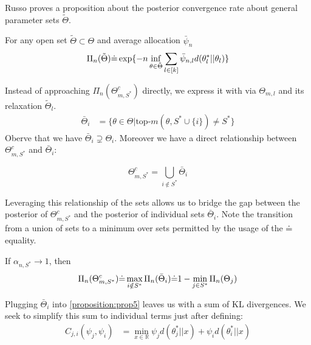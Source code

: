 Russo proves a proposition about the posterior convergence rate about general parameter sets $\tilde{\Theta}$.

\begin{proposition}\label{proposition:prop5}
  For any open set $\tilde{\Theta} \subset \Theta$ and average allocation $\bar{\psi}_n$
  \[\Pi_n(\tilde{\Theta}) \dot{=} \exp\{-n \inf_{\theta \in \tilde{\Theta}} \sum_{l \in [k]} \bar{\psi}_{n, l} d(\theta^*_l || \theta_l)\}\]
\end{proposition}

Instead of approaching $\Pi_n(\Theta_{m, S^*}^c)$ directly, we express it with via $\Theta_{m, l}$ and its relaxation $\tilde{\Theta}_l$.
\begin{align}
    \bar{\Theta}_i &= \{ \theta \in \Theta | \text{top-}m(\theta, S^* \cup \{i\}) \neq S^*\}
\end{align}
Oberve that we have $\bar{\Theta}_i \supsetneq \Theta_i$. Moreover we have a direct relationship between $\Theta_{m, S^*}^c$ and $\bar{\Theta}_i$:

\begin{lemma}\label{lemma:set_relation_S*_i}
  \[\Theta_{m, S^*}^c = \bigcup_{i \notin S^*} \bar{\Theta}_i \label{eq: eq_union}\]
\end{lemma}

Leveraging this relationship of the sets allows us to bridge the gap between the posterior of $\Theta_{m, S^*}^c$ and the posterior of individual sets $\bar{\Theta}_i$. Note the transition from a union of sets to a minimum over sets permitted by the usage of the $\dot{=}$ equality.

\begin{lemma}\label{lemma:posterior_S*_i} If $\alpha_{n, S^*} \rightarrow 1$, then
  \begin{align}
    \Pi_n(\Theta_{m, S^*}^c) \dot{=} \max_{i \notin S^*} \Pi_n(\bar{\Theta}_i) \dot{=} 1 - \min_{j \in S^*} \Pi_n(\Theta_j)
  \end{align}
\end{lemma}

Plugging $\bar{\Theta}_i$ into \ref{proposition:prop5} leaves us with a sum of KL divergences. We seek to simplify this sum to individual terms just after defining:
\begin{align}
  C_{j, i}(\psi_j,\psi_i) &=  \min_{x \in \mathbb{R}} \psi_j d(\theta^*_{j} || x) + \psi_i d(\theta_{i}^* ||x) \label{eq: C}
\end{align}


